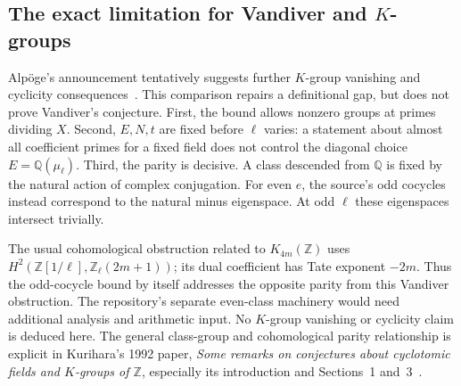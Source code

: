 \subsection{The exact limitation for Vandiver and \texorpdfstring{$K$}{K}-groups}

Alp\"oge's announcement tentatively suggests further $K$-group vanishing
and cyclicity consequences~\cite{alponge}. This comparison repairs a
definitional gap, but does not prove Vandiver's
conjecture. First, the bound allows nonzero groups at primes dividing $X$.
Second, $E,N,t$ are fixed before $\ell$ varies: a statement about almost all
coefficient primes for a fixed field does not control the diagonal choice
$E=\mathbb Q(\mu_\ell)$. Third, the parity is decisive. A class descended
from $\mathbb Q$ is fixed by the natural action of complex conjugation.
For even $e$, the source's odd cocycles instead correspond to the natural
minus eigenspace. At odd $\ell$ these eigenspaces intersect trivially.

The usual cohomological obstruction related to $K_{4m}(\mathbb Z)$ uses
$H^2(\mathbb Z[1/\ell],\mathbb Z_\ell(2m+1))$; its dual coefficient has
Tate exponent $-2m$. Thus the odd-cocycle bound by itself addresses the
opposite parity from this Vandiver obstruction. The repository's separate
even-class machinery would need additional analysis and arithmetic input.
No $K$-group vanishing or cyclicity claim is deduced here. The general
class-group and cohomological parity relationship is explicit in
Kurihara's 1992 paper, \emph{Some remarks on conjectures about cyclotomic
fields and $K$-groups of $\mathbb Z$}, especially its introduction and
Sections~1 and~3~\cite{kurihara}.
